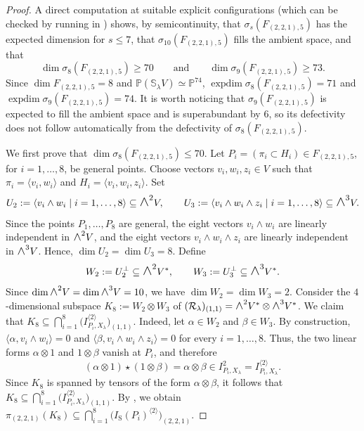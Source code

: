 \documentclass[a4paper,reqno]{amsart}
\theoremstyle{plainnopunct}
\theoremstyle{definitionnopunct}
\newcommand{\superwedge}{\mathlarger{\mathlarger{\wedge}}}
\renewcommand{\P}{\mathbb{P}}
\renewcommand{\S}{\mathbb{S}}
\newcommand{\cR}{\mathcal{R}}
\DeclareMathOperator{\expdim}{expdim}
\begin{document}
\begin{proof}
A direct computation at suitable explicit configurations (which can be checked by running  in \cite{Repo}) shows, by
semicontinuity, that $\sigma_s(F_{(2,2,1),5})$ has the expected
dimension for $s\leq 7$, that
$\sigma_{10}(F_{(2,2,1),5})$ fills the ambient space, and that
\[
\dim \sigma_8(F_{(2,2,1),5})\geq 70
\qquad\text{and}\qquad
\dim \sigma_9(F_{(2,2,1),5})\geq 73.
\] Since $\dim F_{(2,2,1),5}=8$ and $\P(\S_\lambda V)\simeq\P^{74}$, $\expdim \sigma_8(F_{(2,2,1),5})=71$ and $\expdim \sigma_9(F_{(2,2,1),5})=74$. It is worth noticing that
$\sigma_9(F_{(2,2,1),5})$ is expected to fill the ambient space
and is superabundant by $6$, so its defectivity does not follow
automatically from the defectivity of
$\sigma_8(F_{(2,2,1),5})$.

We first prove that $\dim \sigma_8(F_{(2,2,1),5})\leq 70$. Let $P_i=(\pi_i\subset H_i)\in F_{(2,2,1),5}$, for $i=1,\dots,8$, be general points. Choose vectors $v_i,w_i,z_i\in V$ such that $\pi_i=\langle v_i,w_i\rangle$ and $H_i=\langle v_i,w_i,z_i\rangle$. Set
\[
U_2:=\left\langle v_i\wedge w_i\mid i=1,\dots,8\right\rangle\subseteq\superwedge^2V,\qquad
U_3:=\left\langle v_i\wedge w_i\wedge z_i\mid i=1,\dots,8\right\rangle\subseteq\superwedge^3V.
\]
Since the points $P_1,\dots,P_8$ are general, the eight vectors $v_i\wedge w_i$ are linearly independent in $\superwedge^2V$, and the eight vectors $v_i\wedge w_i\wedge z_i$ are linearly independent in $\superwedge^3V$. Hence, $\dim U_2=\dim U_3=8$. Define
\[
W_2:=U_2^\perp\subseteq\superwedge^2V^*,\qquad W_3:=U_3^\perp\subseteq\superwedge^3V^*.
\]
Since $\dim\superwedge^2V=\dim\superwedge^3V=10$, we have $\dim W_2=\dim W_3=2$. Consider the $4$-dimensional subspace $K_8:=W_2\otimes W_3$ of $(\cR_\lambda)_{(1,1)}=\superwedge^2V^*\otimes\superwedge^3V^*$. We claim that {$K_8\subseteq\bigcap_{i=1}^8 \bigl(I_{P_i,X_\lambda}^{\langle 2\rangle}\bigr)_{(1,1)}$}. Indeed, let $\alpha\in W_2$ and $\beta\in W_3$. By construction, $\langle\alpha,v_i\wedge w_i\rangle=0$ and $\langle\beta,v_i\wedge w_i\wedge z_i\rangle=0$ for every $i=1,\dots,8$. Thus, the two linear forms $\alpha\otimes 1$ and $1\otimes\beta$ vanish at $P_i$, and therefore
\[
(\alpha\otimes 1)\star(1\otimes\beta)
=
\alpha\otimes\beta
\in
I_{P_i,X_\lambda}^2
=
I_{P_i,X_\lambda}^{\langle2\rangle}.
\]
Since $K_8$ is spanned by tensors of the form $\alpha\otimes\beta$, it follows that {$K_8\subseteq\bigcap_{i=1}^8 \bigl(I_{P_i,X_\lambda}^{\langle 2\rangle}\bigr)_{(1,1)}$}. By , we obtain $\pi_{(2,2,1)}(K_8)\subseteq\bigcap_{i=1}^8 \bigl(I_{\mathrm S}(P_i)^{\langle 2\rangle}\bigr)_{(2,2,1)}$.


\end{proof}
\end{document}

